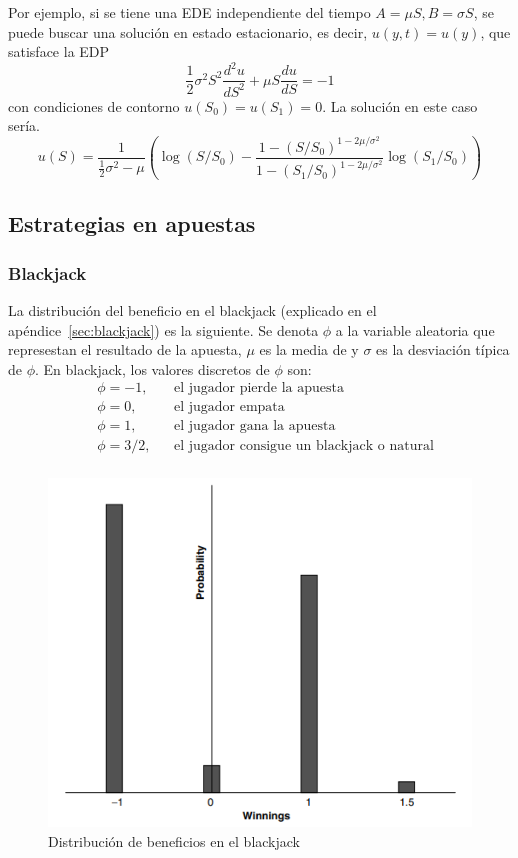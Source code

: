 Por ejemplo, si se tiene una EDE independiente del tiempo $A=\mu S, B=\sigma S$, se puede buscar una solución en estado estacionario, es decir, $u(y, t) = u(y)$, que satisface la EDP
\[
    \frac{1}{2}\sigma^2 S^2 \frac{d^2 u}{dS^2} + \mu S \frac{du}{dS} = -1
\]
con condiciones de contorno $u(S_0) = u(S_1) = 0$. La solución en este caso sería.
\[
    u(S) = \frac{1}{\frac{1}{2}\sigma^2 - \mu} \left( \log(S/S_0) - \frac{1 - (S/S_0)^{1-2\mu/\sigma^2}}{1 - (S_1/S_0)^{1-2\mu/\sigma^2}} \log(S_1/S_0) \right)
\]








\subsection{Estrategias en apuestas}

\subsubsection{Blackjack}
La distribución del beneficio en el blackjack (explicado en el apéndice~\ref{sec:blackjack}) es la siguiente. Se denota $\phi$ a la variable aleatoria que represestan el resultado de la apuesta, $\mu$ es la media de y $\sigma$ es la desviación típica de $\phi$. En blackjack, los valores discretos de $\phi$ son:
\begin{align*}
    &\phi = -1, && \text{el jugador pierde la apuesta} \\
    &\phi = 0, && \text{el jugador empata} \\
    &\phi = 1, && \text{el jugador gana la apuesta} \\
    &\phi = 3/2, && \text{el jugador consigue un blackjack o natural} \\
\end{align*}
\begin{figure}[H]
    \centering
    \includegraphics[width=0.65\linewidth]{Imagenes/3_Aleatoriedad/blackjack_Dist.png}
    \caption{Distribución de beneficios en el blackjack}
\end{figure}




